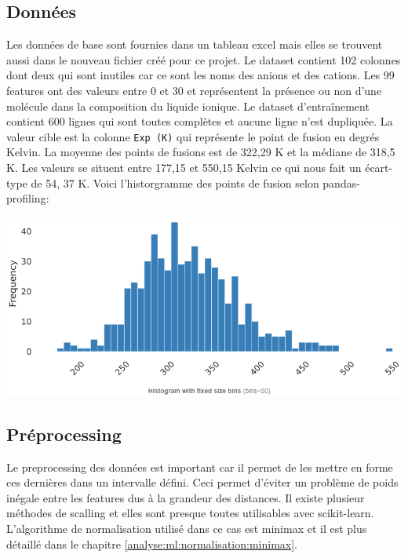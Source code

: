 \subsection{Données}
Les données de base sont fournies dans un tableau excel\cite{SVM_data} mais elles se trouvent aussi dans le nouveau fichier créé pour ce projet\cite{New_data}.
Le dataset contient 102 colonnes dont deux qui sont inutiles car ce sont les noms des anions et des cations.
Les 99 features ont des valeurs entre 0 et 30 et représentent la présence ou non d'une molécule dans la composition du liquide ionique.
Le dataset d'entraînement contient 600 lignes qui sont toutes complètes et aucune ligne n'est dupliquée.
La valeur cible est la colonne \texttt{Exp (K)} qui représente le point de fusion en degrés Kelvin.
La moyenne des points de fusions est de 322,29 K et la médiane de 318,5 K.
Les valeurs se situent entre 177,15 et 550,15 Kelvin ce qui nous fait un écart-type de 54, 37 K.
Voici l'historgramme des points de fusion selon pandas-profiling\cite{pp_old}:
\begin{center}
    \includegraphics[width=140mm]{img/histogram_exp_old_pp.png  }
\end{center}

\subsection{Préprocessing}
Le preprocessing des données est important car il permet de les mettre en forme ces dernières dans un intervalle défini.
Ceci permet d'éviter un problème de poids inégale entre les features dus à la grandeur des distances.
Il existe plusieur méthodes de scalling et elles sont presque toutes utilisables avec scikit-learn\cite{scikit-learn}.
L'algorithme de normalisation utilisé dans ce cas est \acrshort{minimax} et il est plus détaillé dans le chapitre \ref{analyse:ml:normalisation:minimax}.

